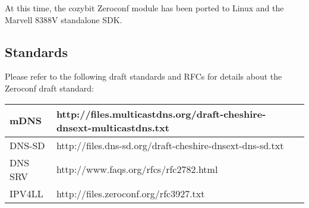 \documentclass[11pt,titlepage]{article}
\begin{document}
At this time, the cozybit Zeroconf module has been ported to Linux and the 
Marvell 8388V standalone SDK.

\subsection{Standards}

Please refer to the following draft standards and RFCs for details about the
Zeroconf draft standard:

\vspace{1ex}
\begin{tabular}{|l|l|}
\hline
mDNS & http://files.multicastdns.org/draft-cheshire-dnsext-multicastdns.txt \\
\hline
DNS-SD & http://files.dns-sd.org/draft-cheshire-dnsext-dns-sd.txt \\
\hline
DNS SRV & http://www.faqs.org/rfcs/rfc2782.html \\
\hline
IPV4LL & http://files.zeroconf.org/rfc3927.txt \\
\hline
\end{tabular}
\end{document}
